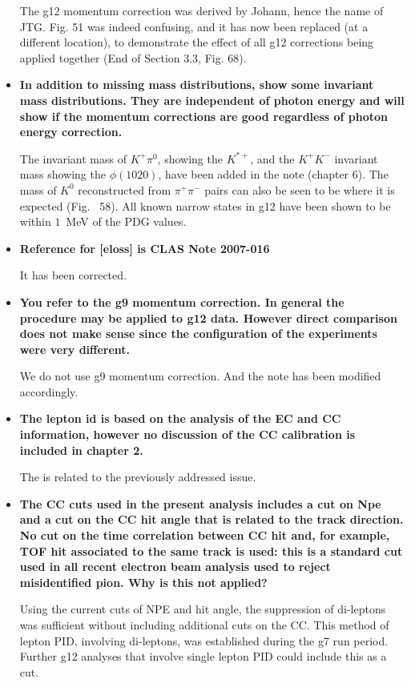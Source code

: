 \documentclass[ 12 pt]{article}
\begin{document}
\begin{itemize}
The g12 momentum correction was derived by Johann, hence the name of JTG. Fig. 51 was indeed confusing, and it has  now been replaced (at a different location), to demonstrate the effect of all g12 corrections being applied together (End of Section 3.3, Fig. 68). 

\item \textbf{In addition to missing mass distributions, show some invariant mass 
distributions. They are independent of photon energy and will show if the 
momentum corrections are good regardless of photon energy correction.}

The invariant mass of $K^+\pi^0$, showing the $K^{*+}$, and the $K^+K^-$ invariant mass showing the $\phi(1020)$,  have been added in the note (chapter 6). The mass of $K^0$ reconstructed from $\pi^+\pi^-$ pairs can also be seen to be where it is expected (Fig. ~58).  All known narrow states in g12 have been shown to be within $1$~MeV of the PDG values.

\item \textbf{Reference for [eloss] is CLAS Note 2007-016 }

It has been corrected.

\item \textbf{You refer to the g9 momentum correction. In general the procedure may be
applied to g12 data. However direct comparison does not make sense since
the configuration of the experiments were very different.}

We do not use g9 momentum correction. And the note has been modified accordingly.


\item  \textbf{The lepton id is based on the analysis of the EC and CC information, however 
no discussion of the CC calibration is included in chapter 2.}

The is related to the previously addressed issue. 


\item  \textbf{The CC cuts used in the present analysis includes a cut on Npe and a cut on 
the CC hit angle that is related to the track direction. No cut on the time 
correlation between CC hit and, for example, TOF hit associated to the same 
track is used: this is a standard cut used in all recent electron beam analysis 
used to reject misidentified pion. Why is this not applied?}

Using the current cuts of NPE and hit angle, the suppression of di-leptons was sufficient without including additional cuts on the CC. This method of lepton PID, involving di-leptons, was established during the g7 run period. Further g12 analyses that involve single lepton PID could include this as a cut.




\end{itemize}
\end{document}
